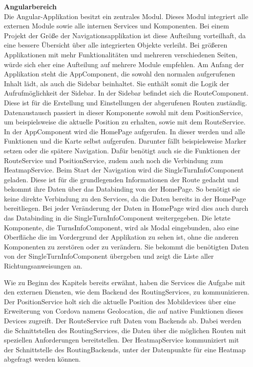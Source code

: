 \textbf{Angularbereich}
\\
Die Angular-Applikation besitzt ein zentrales Modul. 
Dieses Modul integriert alle externen Module sowie alle internen Services und Komponenten.
Bei einem Projekt der Größe der Navigationsapplikation ist diese Aufteilung vorteilhaft, da eine bessere Übersicht über alle integrierten Objekte verleiht. 
Bei größeren Applikationen mit mehr Funktionalitäten und mehreren verschiedenen Seiten, würde sich eher eine Aufteilung auf mehrere Module empfehlen. 
Am Anfang der Applikation steht die AppComponent, die sowohl den normalen aufgerufenen Inhalt lädt, als auch die Sidebar beinhaltet. 
Sie enthält somit die Logik der Aufrufmöglichkeit der Sidebar. 
In der Sidebar befindet sich die RouteComponent. 
Diese ist für die Erstellung und Einstellungen der abgerufenen Routen zuständig. 
Datenaustausch passiert in dieser Komponente sowohl mit dem PositionService, um beispielsweise die aktuelle Position zu erhalten, sowie mit dem RouteService. 
In der AppComponent wird die HomePage aufgerufen. 
In dieser werden und alle Funktionen und die Karte selbst aufgerufen. 
Darunter fällt beispielsweise Marker setzen oder die spätere Navigation. 
Dafür benötigt auch sie die Funktionen der RouteService und PositionService, zudem auch noch die Verbindung zum HeatmapService. 
Beim Start der Navigation wird die SingleTurnInfoComponent geladen. 
Diese ist für die grundlegenden Informationen der Route gedacht und bekommt ihre Daten über das Databinding von der HomePage. 
So benötigt sie keine direkte Verbindung zu den Services, da die Daten bereits in der HomePage bereitliegen. 
Bei jeder Veränderung der Daten in HomePage wird dies auch durch das Databinding in die SingleTurnInfoComponent weitergegeben. 
Die letzte Komponente, die TurnsInfoComponent, wird als Modal eingebunden, also eine Oberfläche die im Vordergrund der Applikation zu sehen ist, ohne die anderen Komponenten zu zerstören oder zu verändern. 
Sie bekommt die benötigten Daten von der SingleTurnInfoComponent übergeben und zeigt die Liste aller Richtungsanweisungen an. 


Wie zu Beginn des Kapitels bereits erwähnt, haben die Services die Aufgabe mit den externen Diensten, wie dem Backend des RoutingServices, zu kommunizieren. 
Der PositionService holt sich die aktuelle Position des Mobildevices über eine Erweiterung von Cordova namens Geolocation, die auf native Funktionen dieses Devices zugreift. 
Der RouteService ruft Daten vom Backends ab. 
Dabei werden die Schnittstellen des RoutingServices, die Daten über die möglichen Routen mit speziellen Anforderungen bereitstellen. 
Der HeatmapService kommuniziert mit der Schnittstelle des RoutingBackends, unter der Datenpunkte für eine Heatmap abgefragt werden können. 


